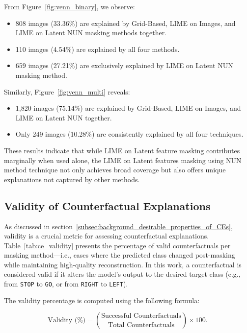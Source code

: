 From Figure~\ref{fig:venn_binary}, we observe:
\begin{itemize}
    \item 808 images (33.36\%) are explained by Grid-Based, LIME on Images, and LIME on Latent NUN masking methods together.
    \item 110 images (4.54\%) are explained by all four methods.
    \item 659 images (27.21\%) are exclusively explained by LIME on Latent NUN masking method.
\end{itemize}

Similarly, Figure~\ref{fig:venn_multi} reveals:
\begin{itemize}
    \item 1,820 images (75.14\%) are explained by Grid-Based, LIME on Images, and LIME on Latent NUN together.
    \item Only 249 images (10.28\%) are consistently explained by all four techniques.
\end{itemize}

These results indicate that while LIME on Latent feature masking contributes marginally when used alone, the LIME on Latent features masking using NUN method technique not only achieves broad coverage but also offers unique explanations not captured by other methods.


\subsection{Validity of Counterfactual Explanations}
As discussed in section~\ref{subsec:background_desirable_properties_of_CEs}, validity is a crucial metric for assessing counterfactual explanations. Table~\ref{tab:ce_validity} presents the percentage of valid counterfactuals per masking method---i.e., cases where the predicted class changed post-masking while maintaining high-quality reconstruction. In this work, a counterfactual is considered valid if it alters the model’s output to the desired target class (e.g., from \texttt{STOP} to \texttt{GO}, or from \texttt{RIGHT} to \texttt{LEFT}).

The validity percentage is computed using the following formula:

\[
\text{Validity (\%)} = \left( \frac{\text{Successful Counterfactuals}}{\text{Total Counterfactuals}} \right) \times 100.
\]

